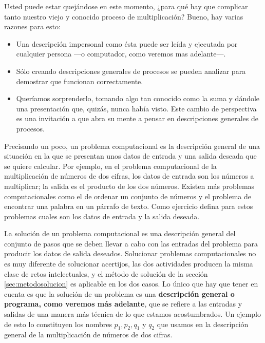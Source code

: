 Usted puede estar quejándose en este momento, ¿para qué hay que complicar tanto
nuestro viejo y conocido proceso de multiplicación? Bueno, hay varias razones
para  esto:

\begin{itemize}

\item Una descripción impersonal como ésta puede ser leída y ejecutada por cualquier
persona ---o computador, como veremos mas adelante---.

\item Sólo creando descripciones generales de procesos se pueden analizar para
demostrar que funcionan correctamente.

\item Queríamos sorprenderlo, tomando algo tan conocido como la suma y dándole
una presentación que, quizás, nunca había visto. Este cambio de perspectiva
es una invitación a que abra su mente a pensar en descripciones generales 
de procesos.
\end{itemize}

Precisando un poco, un problema computacional es la descripción general de una
situación en la que se presentan unos datos de entrada y una salida deseada
que se quiere calcular. Por ejemplo, en el problema computacional de la 
multiplicación de números de dos cifras, los datos de entrada son los números 
a multiplicar; la salida es el producto de los dos números. Existen más 
problemas computacionales como el de ordenar un conjunto de números y el 
problema de encontrar una palabra en un párrafo de texto. Como ejercicio 
defina para estos problemas cuales son los datos de entrada 
y la salida deseada.

La solución de un problema computacional es una descripción general del  
conjunto de pasos que se deben llevar a cabo con las entradas del problema para producir los
datos de salida deseados.  Solucionar problemas computacionales no es muy diferente de 
solucionar acertijos, las dos actividades producen la misma clase de retos
intelectuales, y el método de solución de la sección \ref{sec:metodosolucion} es aplicable en los dos casos.
Lo único que hay que tener en cuenta es que la solución de un problema es una {\bf descripción 
general o programa, como veremos más adelante}, que se refiere a las entradas
y salidas de una manera más técnica de lo que estamos acostumbrados. Un ejemplo
de esto lo constituyen los nombres $p_1,p_2,q_1$ y $q_2$ que usamos en la 
descripción general de la multiplicación de números de dos cifras. 

